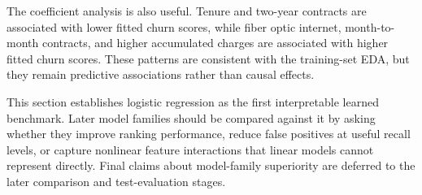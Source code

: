 The coefficient analysis is also useful. Tenure and two-year contracts are associated with lower fitted churn scores, while fiber optic internet, month-to-month contracts, and higher accumulated charges are associated with higher fitted churn scores. These patterns are consistent with the training-set EDA, but they remain predictive associations rather than causal effects.

This section establishes logistic regression as the first interpretable learned benchmark. Later model families should be compared against it by asking whether they improve ranking performance, reduce false positives at useful recall levels, or capture nonlinear feature interactions that linear models cannot represent directly. Final claims about model-family superiority are deferred to the later comparison and test-evaluation stages.

